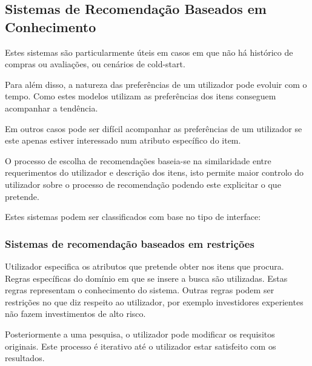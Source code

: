 \subsection{Sistemas de Recomendação Baseados em Conhecimento}
\par\hfill
\par Estes sistemas são particularmente úteis em casos em que não há histórico de compras ou avaliações, ou cenários de cold-start.
\par Para além disso, a natureza das preferências de um utilizador pode evoluir com o tempo. Como estes modelos utilizam as preferências dos itens conseguem acompanhar a tendência.
\par Em outros casos pode ser difícil acompanhar as preferências de um utilizador se este apenas estiver interessado num atributo específico do item.
\par O processo de escolha de recomendações baseia-se na similaridade entre requerimentos do utilizador e descrição dos itens, isto permite maior controlo do utilizador sobre o processo de recomendação podendo este explicitar o que pretende.
\par Estes sistemas podem ser classificados com base no tipo de interface: 
\hfill


\subsubsection{Sistemas de recomendação baseados em restrições}
\par\hfill
\par Utilizador especifica os atributos que pretende obter nos itens que procura. Regras específicas do domínio em que se insere a busca são utilizadas. Estas regras representam o conhecimento do sistema. Outras regras podem ser restrições no que diz respeito ao utilizador, por exemplo investidores experientes não fazem investimentos de alto risco. 
\par Posteriormente a uma pesquisa, o utilizador pode modificar os requisitos originais. Este processo é iterativo até o utilizador estar satisfeito com os resultados.



